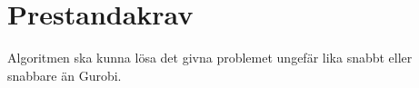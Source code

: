 \section{Prestandakrav}
Algoritmen ska kunna lösa det givna problemet ungefär lika snabbt eller snabbare än Gurobi. 

